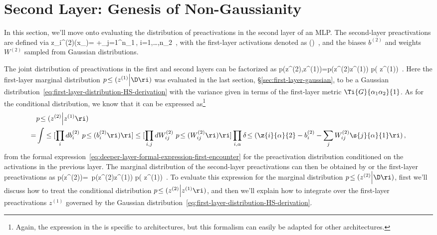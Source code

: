 \section{Second Layer: Genesis of Non-Gaussianity}
\label{sec:second-layer-non-gaussian}
In this section, we'll move onto evaluating the distribution of preactivations in the second layer of an MLP.
The second-layer preactivations are defined via
\be\label{eq:second-layer-preactivations}
 \equiv z_i^{(2)}(x_\alpha)=
+\sum_{j=1}^{n_{1}}\,,  \quad {} \quad i=1,\ldots,n_2\, ,
\ee
with the first-layer activations denoted as
\be
{}\equiv \sigma\!\le(\ri)\, ,
\ee
and the biases $b^{(2)}$ and weights $W^{(2)}$ sampled from Gaussian distributions.

The joint distribution of preactivations in the first and second layers can be factorized as
\be
p\!\le(z^{(2)},z^{(1)}\Big\vert\D\ri)=p\!\le(z^{(2)}\Big\vert z^{(1)}\ri) p\!\le( z^{(1)}\Big\vert\D\ri)\, .
\ee
Here the first-layer marginal distribution $p\!\le( z^{(1)}\Big\vert\D\ri)$ was evaluated in the last section, \S\ref{sec:first-layer-gaussian}, to be a Gaussian distribution~\eqref{eq:first-layer-distribution-HS-derivation} with the variance given in terms of the first-layer metric $\Ti{G}{\alpha_1\alpha_2}{1}$. As for the conditional distribution, we know that it can be expressed as\footnote{Again, the expression in the  is specific to  architectures, but this formalism can easily be adapted for other architectures.}
\begin{align}\label{eq:second-conditioned-first}
&p\!\le(z^{(2)}\Big\vert z^{(1)}\ri)\, \\
=&\int \le[\prod_{i} d b_{i}^{(2)}\ p\!\le(b_{i}^{(2)}\ri)  \ri]\le[ \prod_{i,j} d W_{ij}^{(2)}\ p\!\le(W_{ij}^{(2)}\ri) \ri]\prod_{i,\alpha} \delta\!\le(\z{i}{\alpha}{2}-b_i^{(2)}-\sum_{j}W_{ij}^{(2)}\s{j}{\alpha}{1}\ri)\, ,\nonumber
\end{align}
from the formal expression~\eqref{eq:deeper-layer-formal-expression-first-encounter} for the preactivation distribution conditioned on the activations in the previous layer.
The marginal distribution of the second-layer preactivations can then be obtained by  or  the first-layer preactivations as
\be\label{eq:marginalization-first-layer}
p\!\le(z^{(2)}\Big\vert\D\ri)=\int {}\ p\!\le(z^{(2)}\Big\vert z^{(1)}\ri)  p\!\le( z^{(1)}\Big\vert\D\ri)\, .
\ee
To evaluate this expression for the marginal distribution $p\!\le( z^{(2)}\Big\vert\D\ri)$, first we'll discuss how to treat the conditional distribution $p\!\le(z^{(2)}\Big\vert z^{(1)}\ri)$, and then we'll explain how to integrate over the first-layer preactivations $z^{(1)}$ governed by the Gaussian distribution~\eqref{eq:first-layer-distribution-HS-derivation}.

